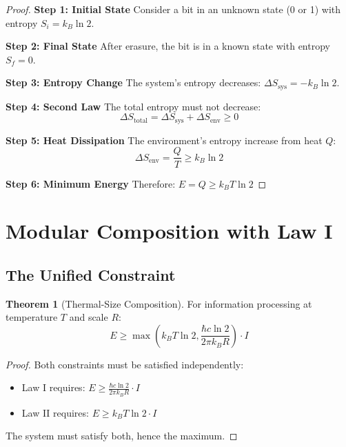 \documentclass[11pt,a4paper]{article}
\theoremstyle{definition}
\newtheorem{theorem}{Theorem}[section]
\begin{document}
\begin{proof}
\textbf{Step 1: Initial State}
Consider a bit in an unknown state (0 or 1) with entropy $S_i = k_B \ln 2$.

\textbf{Step 2: Final State}
After erasure, the bit is in a known state with entropy $S_f = 0$.

\textbf{Step 3: Entropy Change}
The system's entropy decreases: $\Delta S_{\text{sys}} = -k_B \ln 2$.

\textbf{Step 4: Second Law}
The total entropy must not decrease:
\begin{equation}
\Delta S_{\text{total}} = \Delta S_{\text{sys}} + \Delta S_{\text{env}} \geq 0
\end{equation}

\textbf{Step 5: Heat Dissipation}
The environment's entropy increase from heat $Q$:
\begin{equation}
\Delta S_{\text{env}} = \frac{Q}{T} \geq k_B \ln 2
\end{equation}

\textbf{Step 6: Minimum Energy}
Therefore: $E = Q \geq k_B T \ln 2$
\end{proof}

\section{Modular Composition with Law I}

\subsection{The Unified Constraint}

\begin{theorem}[Thermal-Size Composition]
For information processing at temperature $T$ and scale $R$:
\begin{equation}
E \geq \max\left(k_B T \ln 2, \frac{\hbar c \ln 2}{2\pi k_B R}\right) \cdot I
\end{equation}
\end{theorem}

\begin{proof}
Both constraints must be satisfied independently:
\begin{itemize}
\item Law I requires: $E \geq \frac{\hbar c \ln 2}{2\pi k_B R} \cdot I$
\item Law II requires: $E \geq k_B T \ln 2 \cdot I$
\end{itemize}
The system must satisfy both, hence the maximum.
\end{proof}
\end{document}
